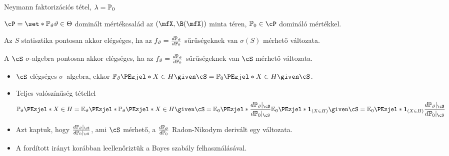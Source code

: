 \documentclass[aspectratio=169,notheorems,9pt,\option]{beamer}
\begin{document}
\begin{frame}{Neymann faktorizációs tétel, $\lambda=\P[0]$}
\begin{theorem}
  $\cP=\set*{\P[\theta]}{\theta\in\Theta}$ dominált mértékcsalád az 
  $(\mfX,\B(\mfX))$ minta téren, $\P[0]\in\cP$ domináló mértékkel. 
  
  Az $S$  statisztika pontosan akkor elégséges, ha az 
  $f_\theta=\frac{d\P[\theta]}{d\P[0]}$ 
  sűrűségeknek van $\sigma(S)$ mérhető változata.

  A $\cS$  $\sigma$-algebra pontosan akkor elégséges, ha az 
  $f_\theta=\frac{d\P[\theta]}{d\P[0]}$ 
  sűrűségeknek van $\cS$ mérhető változata.
\end{theorem}
\begin{itemize}
  \item $\cS$ elégséges $\sigma$--algebra, ekkor $\P[\theta]{X\in H\given \cS}=\P[0]{X\in H\given \cS}$.
  \item Teljes valószínűség tétellel
  \begin{displaymath}
    \P[\theta]{X\in H}
    =\E[\theta]{\P[\theta]{X\in H\given \cS}}
    =\E[0]{\frac{d\P[\theta]|_{\cS}}{d\P[0]|_{\cS}}\E[0]{\I{X\in H}\given \cS}}
    =\E[0]{\I{X\in H}\frac{d\P[\theta]|_{\cS}}{d\P[0]|_{\cS}}}
  \end{displaymath}
  \item Azt kaptuk, hogy $\frac{d\P[\theta]|_{\cS}}{d\P[0]|_\cS}$, ami $\cS$ mérhető,
  a $\frac{d\P[\theta]}{d\P[0]}$ Radon-Nikodym derivált egy változata. 
  \item A fordított irányt korábban leellenőriztük a Bayes szabály felhasználásával.
\end{itemize}
\end{frame}
\end{document}
